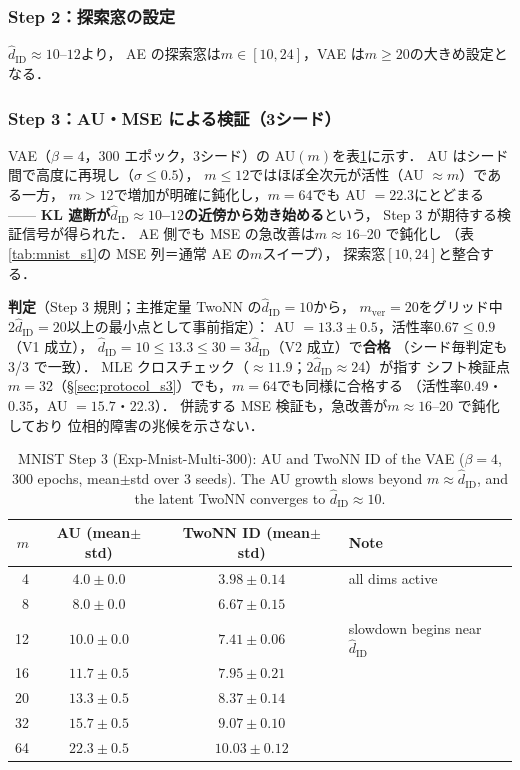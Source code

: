 \documentclass[11pt,a4paper]{jsarticle}
\newcommand{\hatdID}{\hat{d}_{\mathrm{ID}}}
\begin{document}
\subsubsection{Step 2：探索窓の設定}

$\hatdID \approx 10$--$12$より，
AE の探索窓は$m \in [10, 24]$，VAE は$m \geq 20$の大きめ設定となる．

\subsubsection{Step 3：AU・MSE による検証（3シード）}

VAE（$\beta = 4$，300 エポック，3シード）の AU$(m)$を表\ref{tab:mnist_s3}に示す．
AU はシード間で高度に再現し（$\sigma \leq 0.5$），
$m \leq 12$ではほぼ全次元が活性（AU $\approx m$）である一方，
$m > 12$で増加が明確に鈍化し，$m = 64$でも AU $= 22.3$にとどまる——
\textbf{KL 遮断が$\hatdID \approx 10$--$12$の近傍から効き始める}という，
Step 3 が期待する検証信号が得られた．
AE 側でも MSE の急改善は$m \approx 16$--20 で鈍化し
（表\ref{tab:mnist_s1}の MSE 列＝通常 AE の$m$スイープ），
探索窓$[10, 24]$と整合する．

\textbf{判定}（Step 3 規則；主推定量 TwoNN の$\hatdID = 10$から，
$m_{\mathrm{ver}} = 20$をグリッド中$2\hatdID = 20$以上の最小点として事前指定）：
AU $= 13.3 \pm 0.5$，活性率$0.67 \leq 0.9$（V1 成立），
$\hatdID = 10 \leq 13.3 \leq 30 = 3\hatdID$（V2 成立）で\textbf{合格}
（シード毎判定も 3/3 で一致）．
MLE クロスチェック（$\approx 11.9$；$2\hatdID \approx 24$）が指す
シフト検証点$m = 32$（§\ref{sec:protocol_s3}）でも，$m = 64$でも同様に合格する
（活性率$0.49$・$0.35$，AU $= 15.7$・$22.3$）．
併読する MSE 検証も，急改善が$m \approx 16$--20 で鈍化しており
位相的障害の兆候を示さない．

\begin{table}[H]
\centering
\caption{MNIST Step 3 (Exp-Mnist-Multi-300): AU and TwoNN ID of the VAE
($\beta = 4$, 300 epochs, mean$\pm$std over 3 seeds). The AU growth slows
beyond $m \approx \hatdID$, and the latent TwoNN converges to
$\hatdID \approx 10$.}
\label{tab:mnist_s3}
\small
\begin{tabular}{rccl}
\toprule
$m$ & AU (mean$\pm$std) & TwoNN ID (mean$\pm$std) & Note \\
\midrule
 4 & $4.0 \pm 0.0$ & $3.98 \pm 0.14$ & all dims active \\
 8 & $8.0 \pm 0.0$ & $6.67 \pm 0.15$ & \\
12 & $10.0 \pm 0.0$ & $7.41 \pm 0.06$ & slowdown begins near $\hatdID$ \\
16 & $11.7 \pm 0.5$ & $7.95 \pm 0.21$ & \\
20 & $13.3 \pm 0.5$ & $8.37 \pm 0.14$ & \\
32 & $15.7 \pm 0.5$ & $9.07 \pm 0.10$ & \\
64 & $22.3 \pm 0.5$ & $10.03 \pm 0.12$ & \\
\bottomrule
\end{tabular}
\end{table}
\end{document}
